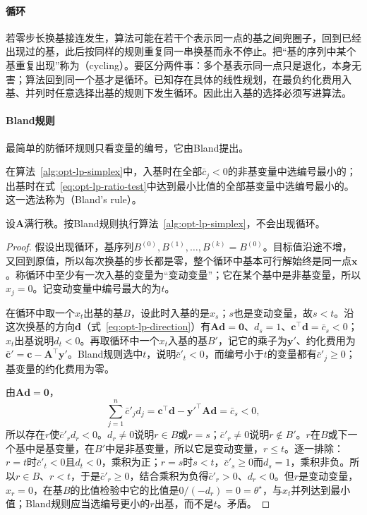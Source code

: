 \paragraph{循环}
若零步长换基接连发生，算法可能在若干个表示同一点的基之间兜圈子，回到已经出现过的基，此后按同样的规则重复同一串换基而永不停止。把“基的序列中某个基重复出现”称为（cycling）。要区分两件事：多个基表示同一点只是退化，本身无害；算法回到同一个基才是循环。已知存在具体的线性规划，在最负约化费用入基、并列时任意选择出基的规则下发生循环。因此出入基的选择必须写进算法。

\paragraph{Bland规则}
最简单的防循环规则只看变量的编号，它由Bland提出。

\begin{definition}[Bland规则]
\label{def:opt-lp-bland}
在算法~\ref{alg:opt-lp-simplex}中，入基时在全部$\bar c_j<0$的非基变量中选编号最小的；出基时在式~\eqref{eq:opt-lp-ratio-test}中达到最小比值的全部基变量中选编号最小的。这一选法称为（Bland's rule）。
\end{definition}

\begin{theorem}[Bland规则不会循环]
\label{thm:opt-lp-bland}
设$\bm A$满行秩。按Bland规则执行算法~\ref{alg:opt-lp-simplex}，不会出现循环。
\end{theorem}

\begin{proof}
假设出现循环，基序列$B^{(0)},B^{(1)},\dots,B^{(k)}=B^{(0)}$。目标值沿途不增，又回到原值，所以每次换基的步长都是零，整个循环中基本可行解始终是同一点$\bm x$。称循环中至少有一次入基的变量为“变动变量”；它在某个基中是非基变量，所以$x_j=0$。记变动变量中编号最大的为$t$。

在循环中取一个$x_t$出基的基$B$，设此时入基的是$x_s$；$s$也是变动变量，故$s<t$。沿这次换基的方向$\bm d$（式~\eqref{eq:opt-lp-direction}）有$\bm A\bm d=\bm 0$、$d_s=1$、$\bm c^\top\bm d=\bar c_s<0$；$x_t$出基说明$d_t<0$。再取循环中一个$x_t$入基的基$B'$，记它的乘子为$\bm y'$、约化费用为$\bar{\bm c}'=\bm c-\bm A^\top\bm y'$。Bland规则选中$t$，说明$\bar c'_t<0$，而编号小于$t$的变量都有$\bar c'_j\ge0$；基变量的约化费用为零。

由$\bm A\bm d=\bm 0$，
\[
  \sum_{j=1}^n\bar c'_jd_j=\bm c^\top\bm d-\bm y'^\top\bm A\bm d=\bar c_s<0,
\]
所以存在$r$使$\bar c'_rd_r<0$。$d_r\ne0$说明$r\in B$或$r=s$；$\bar c'_r\ne0$说明$r\notin B'$。$r$在$B$或下一个基中是基变量，在$B'$中是非基变量，所以它是变动变量，$r\le t$。逐一排除：$r=t$时$\bar c'_t<0$且$d_t<0$，乘积为正；$r=s$时$s<t$，$\bar c'_s\ge0$而$d_s=1$，乘积非负。所以$r\in B$、$r<t$，于是$\bar c'_r\ge0$，结合乘积为负得$\bar c'_r>0$、$d_r<0$。但$r$是变动变量，$x_r=0$，在基$B$的比值检验中它的比值是$0/(-d_r)=0=\theta^\star$，与$x_t$并列达到最小值；Bland规则应当选编号更小的$r$出基，而不是$t$。矛盾。
\end{proof}

